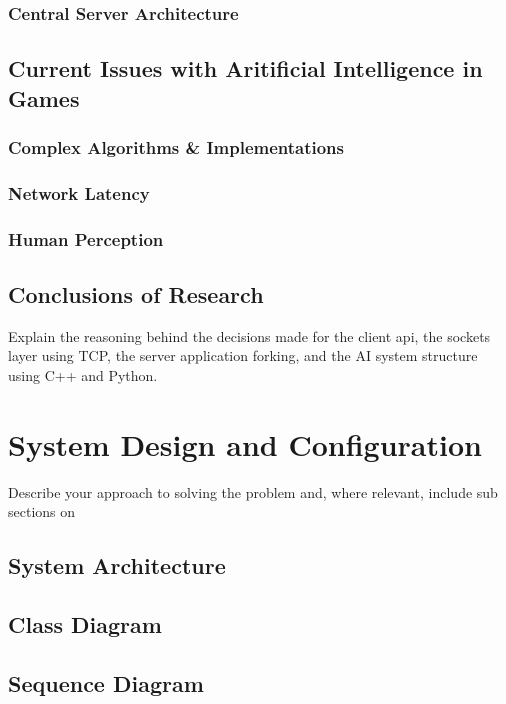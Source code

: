 \documentclass[12pt,a4paper,titlepage]{article}
\begin{document}
\subsubsection{Central Server Architecture}

\subsection{Current Issues with Aritificial Intelligence in Games}

\subsubsection{Complex Algorithms \& Implementations}

\subsubsection{Network Latency}

\subsubsection{Human Perception}

\subsection{Conclusions of Research}

Explain the reasoning behind the decisions made for the client api, the sockets layer using TCP, the server application forking, and the AI system structure using C++ and Python.

\section{System Design and Configuration}
Describe your approach to solving the problem and, where relevant, include sub sections on

\subsection{System Architecture}

\subsection{Class Diagram}

\subsection{Sequence Diagram}
\end{document}
